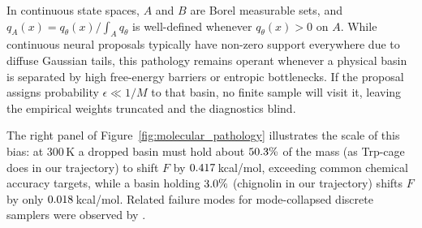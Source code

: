 In continuous state spaces, $A$ and $B$ are Borel measurable sets, and $q_A(x) = q_\theta(x)/\int_A q_\theta$ is well-defined whenever $q_\theta(x) > 0$ on $A$. While continuous neural proposals typically have non-zero support everywhere due to diffuse Gaussian tails, this pathology remains operant whenever a physical basin is separated by high free-energy barriers or entropic bottlenecks. If the proposal assigns probability $\epsilon \ll 1/M$ to that basin, no finite sample will visit it, leaving the empirical weights truncated and the diagnostics blind.

The right panel of Figure~\ref{fig:molecular_pathology} illustrates the scale of this bias: at 300\,K a dropped basin must hold about $50.3\%$ of the mass (as Trp-cage does in our trajectory) to shift $F$ by $0.417$\,kcal/mol, exceeding common chemical accuracy targets, while a basin holding $3.0\%$ (chignolin in our trajectory) shifts $F$ by only $0.018$\,kcal/mol. Related failure modes for mode-collapsed discrete samplers were observed by \citet{xu2026modecollapse}.